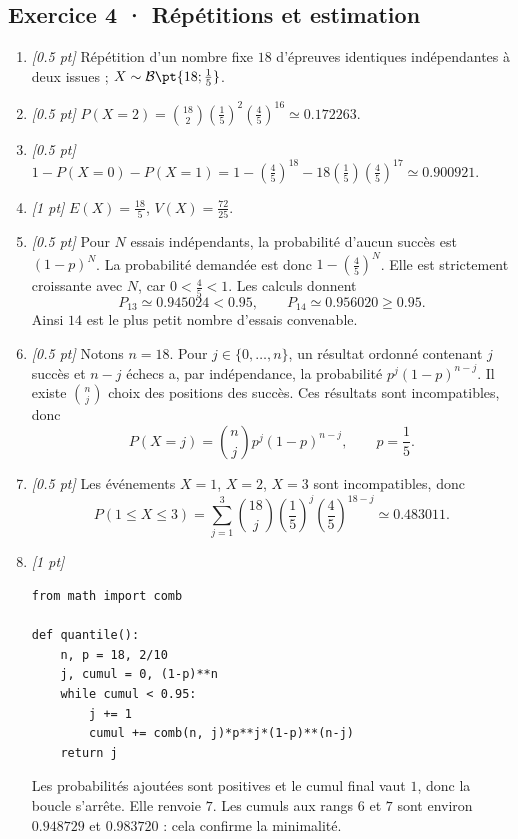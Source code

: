 \subsection*{Exercice 4 · Répétitions et estimation}\begin{enumerate}

\item \textit{[\num{0,5} pt]} Répétition d'un nombre fixe $18$ d'épreuves identiques indépendantes à deux issues ; $X\sim\mathcal B\pt{18;\frac{1}{5}}$.

\item \textit{[\num{0,5} pt]} $P(X=2)=\binom{18}2(\frac{1}{5})^2(\frac{4}{5})^{16}\simeq\num{0,172263}$.

\item \textit{[\num{0,5} pt]} $1-P(X=0)-P(X=1)=1-(\frac{4}{5})^{18}-18(\frac{1}{5})(\frac{4}{5})^{17}\simeq\num{0,900921}$.

\item \textit{[1 pt]} $E(X)=\frac{18}{5}$, $V(X)=\frac{72}{25}$.

\item \textit{[\num{0,5} pt]} Pour $N$ essais indépendants, la probabilité d'aucun succès est $(1-p)^N$. La probabilité demandée est donc $1-(\frac{4}{5})^N$. Elle est strictement croissante avec $N$, car $0<\frac{4}{5}<1$. Les calculs donnent
\[P_{13}\simeq\num{0,945024}<\num{0,95},\qquad P_{14}\simeq\num{0,956020}\ge\num{0,95}.\]
Ainsi $14$ est le plus petit nombre d'essais convenable.

\item \textit{[\num{0,5} pt]} Notons $n=18$. Pour $j\in\{0,\ldots,n\}$, un résultat ordonné contenant $j$ succès et $n-j$ échecs a, par indépendance, la probabilité $p^j(1-p)^{n-j}$. Il existe $\binom nj$ choix des positions des succès. Ces résultats sont incompatibles, donc
\[P(X=j)=\binom nj p^j(1-p)^{n-j},\qquad p=\frac{1}{5}.\]

\item \textit{[\num{0,5} pt]} Les événements $X=1$, $X=2$, $X=3$ sont incompatibles, donc
\[P(1\le X\le3)=\sum_{j=1}^3\binom{18}j(\frac{1}{5})^j(\frac{4}{5})^{18-j}\simeq\num{0,483011}.\]


\item \textit{[1 pt]} 
\begin{lstlisting}
from math import comb

def quantile():
    n, p = 18, 2/10
    j, cumul = 0, (1-p)**n
    while cumul < 0.95:
        j += 1
        cumul += comb(n, j)*p**j*(1-p)**(n-j)
    return j
\end{lstlisting}
Les probabilités ajoutées sont positives et le cumul final vaut $1$, donc la boucle s'arrête. Elle renvoie $7$. Les cumuls aux rangs $6$ et $7$ sont environ $\num{0,948729}$ et $\num{0,983720}$ : cela confirme la minimalité.

\end{enumerate}

